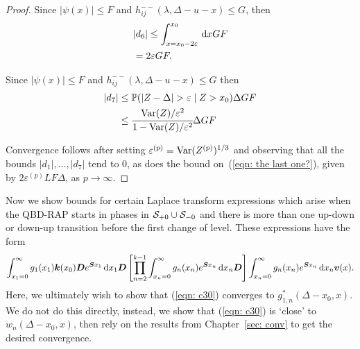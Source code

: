 \begin{proof}
	Since \(|\psi(x)|\leq F\) and \(h_{ij}^{--}(\lambda,\Delta-u-x)\leq G\), then
	\begin{align}
		&|d_6| \leq \int_{x=x_0-2\varepsilon}^{x_0} \, \mathrm{d} x GF\nonumber 
		\\&= 2\varepsilon GF.
	\end{align}
	
	Since \(|\psi(x)|\leq F\) and \(h_{ij}^{--}(\lambda,\Delta-u-x)\leq G\) then
	\begin{align}
		|d_7|&\leq \mathbb P(|Z-\Delta|> \varepsilon\mid Z>x_0)\Delta GF
		\\&\leq \cfrac{\var(Z)/\varepsilon^2}{1-\var(Z)/\varepsilon^2}\Delta GF
	\end{align}
	
	Convergence follows after setting \(\varepsilon^{(p)}=\mathrm{Var}(Z^{(p)})^{1/3}\) and observing that all the bounds \(|d_1|,\dots,|d_7|\) tend to 0, as does the bound on~(\ref{eqn: the last one?}), given by \(2\varepsilon^{(p)}LF\Delta\), as \(p\to\infty\). 
\end{proof}  

	Now we show bounds for certain Laplace transform expressions which arise when the QBD-RAP starts in phases in \(\mathcal{S}_{+0}\cup\mathcal{S}_{-0}\) and there is more than one up-down or down-up transition before the first change of level. These expressions have the form
	\begin{align}
		\int_{x_1=0}^\infty g_1(x_1) \boldsymbol k(x_0) \boldsymbol D e^{\boldsymbol{S}x_1}\, \mathrm{d} x_1\boldsymbol D 
            	\left[\prod_{n=2}^{k-1}\int_{x_n=0}^\infty g_n(x_n) e^{\boldsymbol{S}x_n} \, \mathrm{d} x_n
		\boldsymbol D\right]
            	\int_{x_n=0}^\infty g_{n}(x_n) e^{\boldsymbol{S}x_n} \, \mathrm{d} x_n {\boldsymbol v}(x). \label{eqn: c30}
	\end{align}
	Here, we ultimately wish to show that (\ref{eqn: c30}) converges to \(g_{1,n}^*(\Delta-x_0,x)\). We do not do this directly, instead, we show that (\ref{eqn: c30}) is `close' to \(w_n(\Delta-x_0,x)\), then rely on the results from Chapter~\ref{sec: conv} to get the desired convergence. 
	
